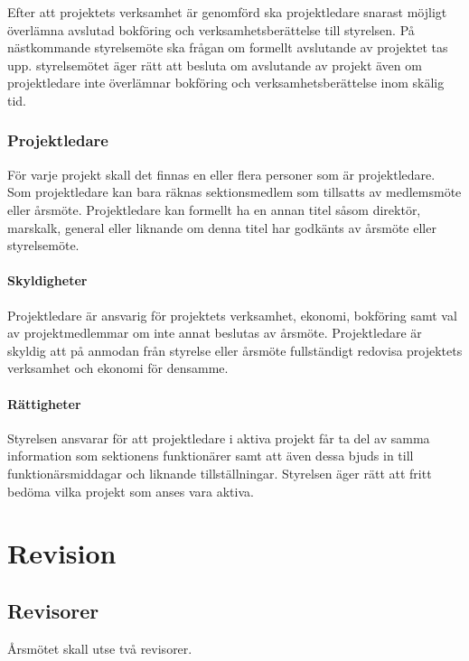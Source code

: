 \documentclass{../resources/dgovdoc}
\begin{document}
Efter att projektets verksamhet är genomförd ska projektledare snarast möjligt
överlämna avslutad bokföring och verksamhetsberättelse till styrelsen.
På nästkommande styrelsemöte ska frågan om formellt avslutande av projektet tas upp.
styrelsemötet äger rätt att besluta om avslutande av projekt även om projektledare inte
överlämnar bokföring och verksamhetsberättelse inom skälig tid.

\subsubsection{Projektledare}

För varje projekt skall det finnas en eller flera personer som är
projektledare. Som projektledare kan bara räknas sektionsmedlem som tillsatts
av medlemsmöte eller årsmöte. Projektledare kan formellt ha en annan titel såsom direktör, marskalk,
general eller liknande om denna titel har godkänts av årsmöte eller styrelsemöte.

\paragraph{Skyldigheter}

Projektledare är ansvarig för projektets verksamhet, ekonomi, bokföring samt
val av projektmedlemmar om inte annat beslutas av årsmöte. Projektledare är
skyldig att på anmodan från styrelse eller årsmöte fullständigt redovisa
projektets verksamhet och ekonomi för densamme.

\paragraph{Rättigheter}

Styrelsen ansvarar för att projektledare i aktiva projekt får ta del av
samma information som sektionens funktionärer samt att även dessa bjuds
in till funktionärsmiddagar och liknande tillställningar. Styrelsen äger
rätt att fritt bedöma vilka projekt som anses vara aktiva.

\section{Revision}

\subsection{Revisorer}
\label{sec:revisorer}

Årsmötet skall utse två revisorer.
\end{document}
